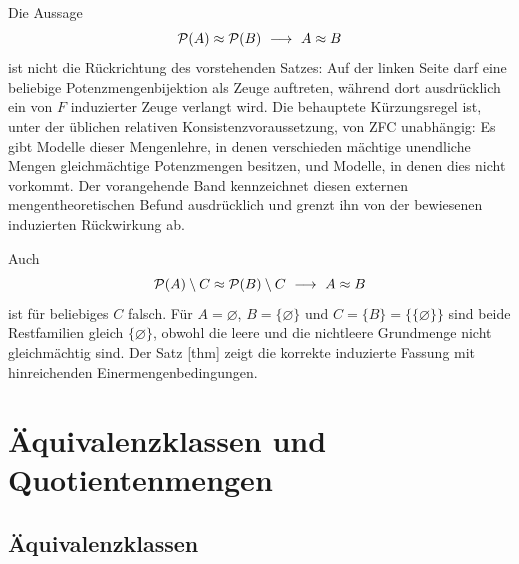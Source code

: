 \documentclass[main.tex]{subfiles}
\begin{document}
\begin{remark}
Die Aussage
\[
  \powerset(A)\EqCard\powerset(B)\ \longrightarrow\ A\EqCard B
\]
ist nicht die Rückrichtung des vorstehenden Satzes: Auf der linken Seite
darf eine beliebige Potenzmengenbijektion als Zeuge auftreten, während dort
ausdrücklich ein von \(F\) induzierter Zeuge verlangt wird.  Die behauptete
Kürzungsregel ist, unter der üblichen relativen Konsistenzvoraussetzung, von
ZFC unabhängig: Es gibt Modelle dieser Mengenlehre, in denen verschieden
mächtige unendliche Mengen gleichmächtige Potenzmengen besitzen, und Modelle,
in denen dies nicht vorkommt.  Der vorangehende Band kennzeichnet diesen
externen mengentheoretischen Befund ausdrücklich und grenzt ihn von der
bewiesenen induzierten Rückwirkung ab.

Auch
\[
  \mathcal{P}(A)\setminus C\mathrel{\approx}\mathcal{P}(B)\setminus C
  \ \longrightarrow\ A\mathrel{\approx} B
\]
ist für beliebiges \(C\) falsch.  Für
\(A=\varnothing\), \(B=\{\varnothing\}\) und
\(C=\{B\}=\{\{\varnothing\}\}\) sind beide Restfamilien gleich
\(\{\varnothing\}\), obwohl die leere und die nichtleere Grundmenge nicht
gleichmächtig sind.  Der Satz
[thm] zeigt die korrekte
induzierte Fassung mit hinreichenden Einermengenbedingungen.
\end{remark}

\chapter{Äquivalenzklassen und Quotientenmengen}

\section{Äquivalenzklassen}

\end{document}
